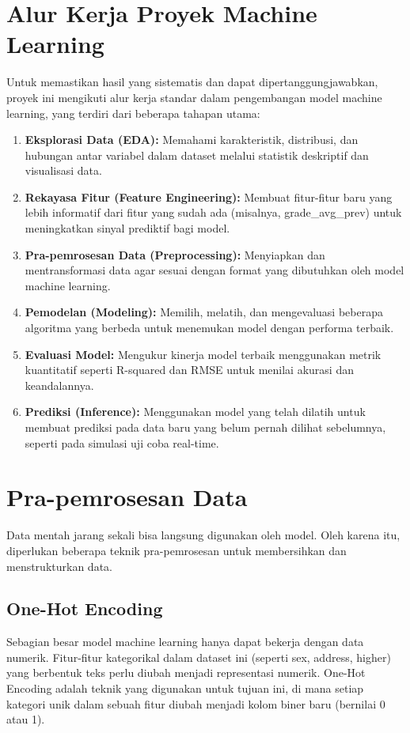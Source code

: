\section{Alur Kerja Proyek Machine Learning}
Untuk memastikan hasil yang sistematis dan dapat dipertanggungjawabkan, proyek ini mengikuti alur kerja standar dalam pengembangan model machine learning, yang terdiri dari beberapa tahapan utama:
\begin{enumerate}
\item \textbf{Eksplorasi Data (EDA):} Memahami karakteristik, distribusi, dan hubungan antar variabel dalam dataset melalui statistik deskriptif dan visualisasi data.
\item \textbf{Rekayasa Fitur (Feature Engineering):} Membuat fitur-fitur baru yang lebih informatif dari fitur yang sudah ada (misalnya, grade_avg_prev) untuk meningkatkan sinyal prediktif bagi model.
\item \textbf{Pra-pemrosesan Data (Preprocessing):} Menyiapkan dan mentransformasi data agar sesuai dengan format yang dibutuhkan oleh model machine learning.
\item \textbf{Pemodelan (Modeling):} Memilih, melatih, dan mengevaluasi beberapa algoritma yang berbeda untuk menemukan model dengan performa terbaik.
\item \textbf{Evaluasi Model:} Mengukur kinerja model terbaik menggunakan metrik kuantitatif seperti R-squared dan RMSE untuk menilai akurasi dan keandalannya.
\item \textbf{Prediksi (Inference):} Menggunakan model yang telah dilatih untuk membuat prediksi pada data baru yang belum pernah dilihat sebelumnya, seperti pada simulasi uji coba real-time.
\end{enumerate}

\section{Pra-pemrosesan Data}
Data mentah jarang sekali bisa langsung digunakan oleh model. Oleh karena itu, diperlukan beberapa teknik pra-pemrosesan untuk membersihkan dan menstrukturkan data.

\subsection{One-Hot Encoding}
Sebagian besar model machine learning hanya dapat bekerja dengan data numerik. Fitur-fitur kategorikal dalam dataset ini (seperti sex, address, higher) yang berbentuk teks perlu diubah menjadi representasi numerik. One-Hot Encoding adalah teknik yang digunakan untuk tujuan ini, di mana setiap kategori unik dalam sebuah fitur diubah menjadi kolom biner baru (bernilai 0 atau 1).

